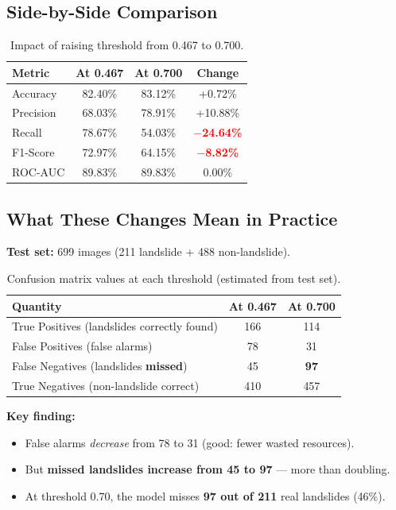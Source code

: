 \documentclass[11pt]{article}
\begin{document}
\subsection{Side-by-Side Comparison}

\begin{table}[H]
\centering
\renewcommand{\arraystretch}{1.3}
\begin{tabular}{lccc}
\toprule
\textbf{Metric} & \textbf{At 0.467} & \textbf{At 0.700} & \textbf{Change} \\
\midrule
Accuracy  & 82.40\% & 83.12\% & \textcolor{green!60!black}{+0.72\%} \\
Precision & 68.03\% & 78.91\% & \textcolor{green!60!black}{+10.88\%} \\
Recall    & 78.67\% & 54.03\% & \textcolor{red}{\textbf{$-$24.64\%}} \\
F1-Score  & 72.97\% & 64.15\% & \textcolor{red}{\textbf{$-$8.82\%}} \\
ROC-AUC   & 89.83\% & 89.83\% & 0.00\% \\
\bottomrule
\end{tabular}
\caption{Impact of raising threshold from 0.467 to 0.700.}
\end{table}

\subsection{What These Changes Mean in Practice}

\noindent\textbf{Test set:} 699 images (211 landslide + 488 non-landslide).

\begin{table}[H]
\centering
\renewcommand{\arraystretch}{1.3}
\begin{tabular}{lcc}
\toprule
\textbf{Quantity} & \textbf{At 0.467} & \textbf{At 0.700} \\
\midrule
True Positives (landslides correctly found)   & 166 & 114 \\
False Positives (false alarms)                & 78  & 31 \\
False Negatives (landslides \textbf{missed})  & 45  & \textbf{97} \\
True Negatives (non-landslide correct)        & 410 & 457 \\
\bottomrule
\end{tabular}
\caption{Confusion matrix values at each threshold (estimated from test set).}
\end{table}

\noindent\textbf{Key finding:}
\begin{itemize}[noitemsep]
    \item False alarms \textit{decrease} from 78 to 31 (good: fewer wasted resources).
    \item But \textbf{missed landslides increase from 45 to 97} --- more than doubling.
    \item At threshold 0.70, the model misses \textbf{97 out of 211} real landslides (46\%).
\end{itemize}
\end{document}
